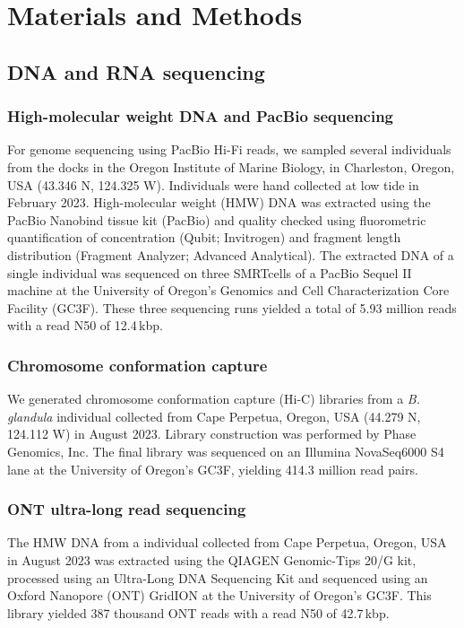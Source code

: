 \section*{Materials and Methods}

\subsection*{DNA and RNA sequencing}

\subsubsection*{High-molecular weight DNA and PacBio sequencing}

For genome sequencing using PacBio Hi-Fi reads, we sampled several \balgla{}
individuals from the docks in the Oregon Institute of Marine Biology, in Charleston,
Oregon, USA (43.346 N, 124.325 W). Individuals were hand collected at low tide in
February 2023. High-molecular weight (HMW) DNA was extracted using the PacBio Nanobind
tissue kit (PacBio) and quality checked using
fluorometric quantification of concentration (Qubit; Invitrogen) and fragment
length distribution (Fragment Analyzer; Advanced Analytical). The extracted DNA
of a single individual was sequenced on three SMRTcells of a PacBio Sequel
II machine at the University of Oregon's Genomics and Cell Characterization Core
Facility (GC3F). These three sequencing runs yielded a total of 5.93 million
reads with a read N50 of 12.4\,kbp.

\subsubsection*{Chromosome conformation capture}

We generated chromosome conformation capture (Hi-C) libraries from a \textit{B.
glandula} individual collected from Cape Perpetua, Oregon, USA (44.279 N, 124.112
W) in August 2023. Library construction was performed by Phase Genomics, Inc.
The final library was sequenced on an Illumina NovaSeq6000 S4 lane at the University
of Oregon's GC3F, yielding 414.3 million read pairs.

\subsubsection*{ONT ultra-long read sequencing}

The HMW DNA from a \bgla{} individual collected from Cape Perpetua,
Oregon, USA in August 2023 was extracted using the QIAGEN Genomic-Tips 20/G kit,
processed using an Ultra-Long DNA Sequencing Kit and sequenced
using an Oxford Nanopore (ONT) GridION at the University of Oregon's GC3F. This
library yielded 387 thousand ONT reads with a read N50 of 42.7\,kbp.

